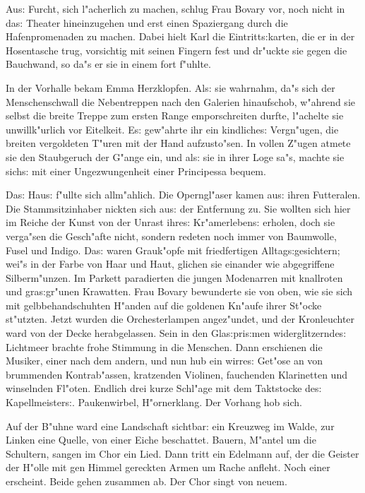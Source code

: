 \documentclass[oneside,12pt]{book}
\newcommand{\s}{s:}%
\begin{document}
Au{\s} Furcht, sich l"acherlich zu machen, schlug Frau Bovary vor,
noch nicht in da{\s} Theater hineinzugehen und erst einen
Spaziergang durch die Hafenpromenaden zu machen. Dabei hielt Karl
die Eintritt{\s}karten, die er in der Hosentasche trug, vorsichtig
mit seinen Fingern fest und dr"uckte sie gegen die Bauchwand, so
da"s er sie in einem fort f"uhlte.

In der Vorhalle bekam Emma Herzklopfen. Al{\s} sie wahrnahm, da"s
sich der Menschenschwall die Nebentreppen nach den Galerien
hinaufschob, w"ahrend sie selbst die breite Treppe zum ersten
Range emporschreiten durfte, l"achelte sie unwillk"urlich vor
Eitelkeit. E{\s} gew"ahrte ihr ein kindliche{\s} Vergn"ugen, die
breiten vergoldeten T"uren mit der Hand aufzusto"sen. In vollen
Z"ugen atmete sie den Staubgeruch der G"ange ein, und al{\s} sie
in ihrer Loge sa"s, machte sie sich{\s} mit einer Ungezwungenheit
einer Principessa bequem.

Da{\s} Hau{\s} f"ullte sich allm"ahlich. Die Operngl"aser kamen
au{\s} ihren Futteralen. Die Stammsitzinhaber nickten sich au{\s}
der Entfernung zu. Sie wollten sich hier im Reiche der Kunst von
der Unrast ihre{\s} Kr"amerleben{\s} erholen, doch sie verga"sen
die Gesch"afte nicht, sondern redeten noch immer von Baumwolle,
Fusel und Indigo. Da{\s} waren Grauk"opfe mit friedfertigen
Alltag{\s}gesichtern; wei"s in der Farbe von Haar und Haut,
glichen sie einander wie abgegriffene Silberm"unzen. Im Parkett
paradierten die jungen Modenarren mit knallroten und
gra{\s}gr"unen Krawatten. Frau Bovary bewunderte sie von oben, wie
sie sich mit gelbbehandschuhten H"anden auf die goldenen Kn"aufe
ihrer St"ocke st"utzten. Jetzt wurden die Orchesterlampen
angez"undet, und der Kronleuchter ward von der Decke
herabgelassen. Sein in den Gla{\s}pri{\s}men widerglitzernde{\s}
Lichtmeer brachte frohe Stimmung in die Menschen. Dann erschienen
die Musiker, einer nach dem andern, und nun hub ein wirre{\s}
Get"ose an von brummenden Kontrab"assen, kratzenden Violinen,
fauchenden Klarinetten und winselnden Fl"oten. Endlich drei kurze
Schl"age mit dem Taktstocke de{\s} Kapellmeister{\s}.
Paukenwirbel, H"ornerklang. Der Vorhang hob sich.

Auf der B"uhne ward eine Landschaft sichtbar: ein Kreuzweg im
Walde, zur Linken eine Quelle, von einer Eiche beschattet. Bauern,
M"antel um die Schultern, sangen im Chor ein Lied. Dann tritt ein
Edelmann auf, der die Geister der H"olle mit gen Himmel gereckten
Armen um Rache anfleht. Noch einer erscheint. Beide gehen zusammen
ab. Der Chor singt von neuem.
\end{document}
